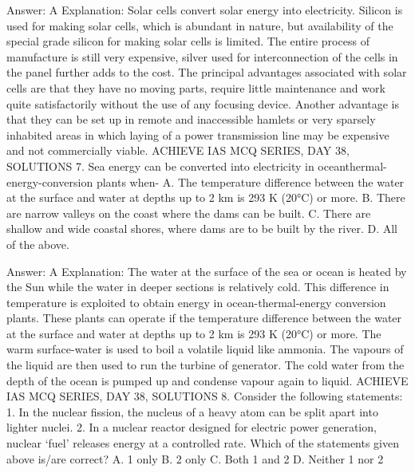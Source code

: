 Answer: A
Explanation: Solar cells convert solar energy into electricity. Silicon is used for making solar cells, which is abundant in nature, but availability of the special grade silicon for making solar cells is limited. The entire process of manufacture is still very expensive, silver used for interconnection of the cells in the panel further adds to the cost. The principal advantages associated with solar cells are that they have no moving parts, require little maintenance and work quite satisfactorily without the use of any focusing device. Another advantage is that they can be set up in remote and inaccessible hamlets or very sparsely inhabited areas in which laying of a power transmission line may be expensive and not commercially viable. ACHIEVE IAS MCQ SERIES, DAY 38, SOLUTIONS 7. Sea energy can be converted into electricity in oceanthermal-energy-conversion plants when- A. The temperature difference between the water at the surface and water at depths up to 2 km is 293 K (20°C) or more. B. There are narrow valleys on the coast where the dams can be built. C. There are shallow and wide coastal shores, where dams are to be built by the river. D. All of the above. 

Answer: A
Explanation: The water at the surface of the sea or ocean is heated by the Sun while the water in deeper sections is relatively cold. This difference in temperature is exploited to obtain energy in ocean-thermal-energy conversion plants. These plants can operate if the temperature difference between the water at the surface and water at depths up to 2 km is 293 K (20°C) or more. The warm surface-water is used to boil a volatile liquid like ammonia. The vapours of the liquid are then used to run the turbine of generator. The cold water from the depth of the ocean is pumped up and condense vapour again to liquid. ACHIEVE IAS MCQ SERIES, DAY 38, SOLUTIONS 8. Consider the following statements: 1. In the nuclear fission, the nucleus of a heavy atom can be split apart into lighter nuclei. 2. In a nuclear reactor designed for electric power generation, nuclear ‘fuel’ releases energy at a controlled rate. Which of the statements given above is/are correct? A. 1 only B. 2 only C. Both 1 and 2 D. Neither 1 nor 2 

